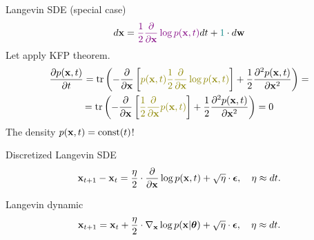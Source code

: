 \begin{frame}{Langevin SDE (special case)}
	\[
		d \mathbf{x} = {\color{violet}\frac{1}{2} \frac{\partial}{\partial \mathbf{x}} \log p(\mathbf{x}, t)} d t + {\color{teal} 1 } \cdot d \mathbf{w}
	\]
	Let apply KFP theorem.
	\begin{multline*}
		\frac{\partial p(\bx, t)}{\partial t} =  \text{tr} \left(- \frac{\partial}{\partial \bx}\left[ {\color{olive}p(\bx, t) \frac{1}{2} \frac{\partial}{\partial \bx} \log p(\bx, t)} \right]  + \frac{1}{2} \frac{\partial^2 p(\bx, t)}{\partial \bx^2} \right) = \\
		= \text{tr} \left(- \frac{\partial}{\partial \bx}\left[ {\color{olive}\frac{1}{2} \frac{\partial}{\partial \bx} p(\bx, t) } \right]  + \frac{1}{2} \frac{\partial^2 p(\bx, t)}{\partial \bx^2} \right) = 0
	\end{multline*}
	The density $p(\mathbf{x}, t) = \text{const}(t)$! \\
	\begin{block}{Discretized Langevin SDE}
		\vspace{-0.3cm}
		\[
			\mathbf{x}_{t + 1} - \mathbf{x}_t = \frac{\eta}{2} \cdot \frac{\partial}{\partial \mathbf{x}} \log p(\mathbf{x}, t) + \sqrt{\eta} \cdot \boldsymbol{\epsilon}, \quad \eta \approx dt.
		\]
		\vspace{-0.4cm}
	\end{block}
	\begin{block}{Langevin dynamic}
		\vspace{-0.3cm}
		\[
			\mathbf{x}_{t + 1} = \mathbf{x}_t + \frac{\eta}{2} \cdot \nabla_{\mathbf{x}} \log p(\mathbf{x} | \boldsymbol{\theta}) + \sqrt{\eta} \cdot \boldsymbol{\epsilon}, \quad \eta \approx dt.
		\]
		\vspace{-0.3cm}
	\end{block}
\end{frame}
